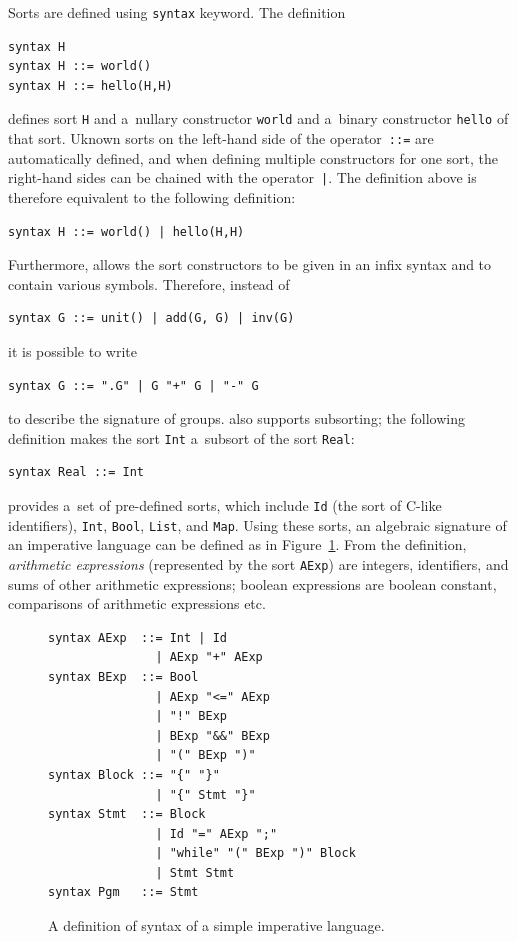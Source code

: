 \documentclass[nolot,nolof,nocover,printed]{fithesis3}
\begin{document}
Sorts are defined using \texttt{syntax} keyword. The definition
\begin{lstlisting}
syntax H
syntax H ::= world()
syntax H ::= hello(H,H)
\end{lstlisting}
defines sort \texttt{H} and a~nullary constructor \texttt{world} and a~binary constructor \texttt{hello} of that sort. Uknown sorts on the left-hand side of the operator~\texttt{::=} are automatically defined, and when defining multiple constructors for one sort, the right-hand sides can be chained with the operator~\texttt{|}. The definition above is therefore equivalent to the following definition:
\begin{lstlisting}
syntax H ::= world() | hello(H,H)
\end{lstlisting}
Furthermore, \K allows the sort constructors to be given in an infix syntax and to contain various symbols. Therefore, instead of
\begin{lstlisting}
syntax G ::= unit() | add(G, G) | inv(G)
\end{lstlisting}
it is possible to write
\begin{lstlisting}
syntax G ::= ".G" | G "+" G | "-" G
\end{lstlisting}
to describe the signature of groups. \K also supports subsorting; the following definition makes the sort \texttt{Int} a~subsort of the sort \texttt{Real}:
\begin{lstlisting}
syntax Real ::= Int
\end{lstlisting}

\K provides a~set of pre-defined sorts, which include \texttt{Id} (the sort of C-like identifiers), \texttt{Int}, \texttt{Bool}, \texttt{List}, and \texttt{Map}. Using these sorts, an algebraic signature of an imperative language can be defined as in Figure~\ref{impSyntax}. From the definition, \textit{arithmetic expressions} (represented by the sort \texttt{AExp}) are integers, identifiers, and sums of other arithmetic expressions; boolean expressions are boolean constant, comparisons of arithmetic expressions etc.

\begin{figure}[ht]
\begin{lstlisting}
syntax AExp  ::= Int | Id
               | AExp "+" AExp
syntax BExp  ::= Bool
               | AExp "<=" AExp
               | "!" BExp
               | BExp "&&" BExp
               | "(" BExp ")"
syntax Block ::= "{" "}"
               | "{" Stmt "}"
syntax Stmt  ::= Block
               | Id "=" AExp ";"
               | "while" "(" BExp ")" Block
               | Stmt Stmt
syntax Pgm   ::= Stmt
\end{lstlisting}
\caption{A definition of syntax of a simple imperative language.}
\label{impSyntax}
\end{figure}
\end{document}
